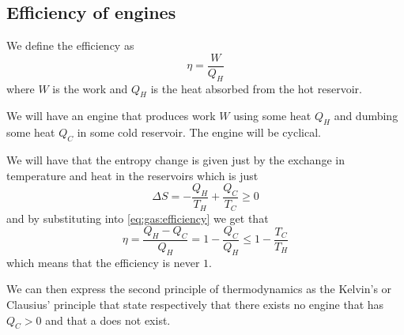 \documentclass[12pt]{extarticle}
\begin{document}
\subsection{Efficiency of engines}

We define the efficiency as
\begin{equation}
    \label{eq:gas:efficiency}
    \eta = \frac{W}{Q_H}
\end{equation}
where $W$ is the work and $Q_H$ is the heat absorbed from the hot reservoir.

We will have an engine that produces work $W$ using some heat $Q_H$ and dumbing some heat $Q_C$ in some cold reservoir.
The engine will be cyclical.

We will have that the entropy change is given just by the exchange in temperature and heat in the reservoirs which is just
\begin{equation}
    \Delta S = - \frac{Q_H}{T_H} + \frac{Q_C}{T_C} \geq 0
\end{equation}
and by substituting into \autoref{eq:gas:efficiency} we get that
\begin{equation}
    \eta = \frac{Q_H - Q_C}{Q_H} = 1 - \frac{Q_C}{Q_H} \leq 1 - \frac{T_C}{T_H}
\end{equation}
which means that the efficiency is never $1$.

We can then express the second principle of thermodynamics as the Kelvin's or Clausius' principle that state respectively that there exists no engine that has $Q_C > 0$ and that a  does not exist.
\end{document}
